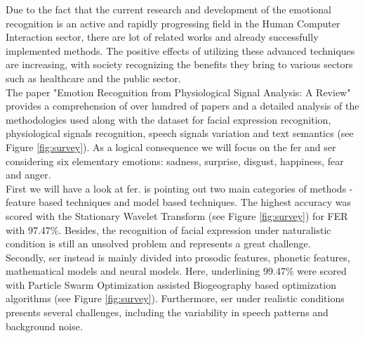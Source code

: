 


\noindent Due to the fact that the current research and development of the emotional recognition is an active and rapidly progressing field in the Human Computer Interaction sector, there are lot of related works and already successfully implemented methods. The positive effects of utilizing these advanced techniques are increasing, with society recognizing the benefits they bring to various sectors such as healthcare and the public sector. \\

\noindent The paper "Emotion Recognition from Physiological Signal Analysis: A Review" \cite{EGGER201935} provides a comprehension of over hundred of papers and a detailed analysis of the methodologies used along with the dataset for facial expression recognition, physiological signals recognition, speech signals variation and text semantics (see Figure \ref{fig:survey}). As a logical consequence we will focus on the \acrshort{fer} and \acrshort{ser} considering six elementary emotions: sadness, surprise, disgust, happiness, fear and anger. \\


\noindent First we will have a look at \acrshort{fer}. is pointing out two main categories of methods - feature based techniques and model based techniques. The highest accuracy was scored with the Stationary Wavelet Transform (see Figure \ref{fig:survey}) for FER with 97.47\%. Besides, the recognition of facial expression under naturalistic condition is still an unsolved problem and represents a great challenge. \\

\noindent Secondly, \acrshort{ser} instead is mainly divided into prosodic features, phonetic features, mathematical models and neural models. Here, underlining 99.47\% were scored with Particle Swarm Optimization assisted Biogeography based optimization algorithms (see Figure \ref{fig:survey}). Furthermore, \acrshort{ser} under realistic conditions presents several challenges, including the variability in speech patterns and background noise. \\
